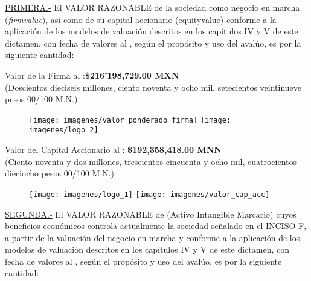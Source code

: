 \textcolor{principal}{\underline{PRIMERA.-}} El \textcolor{principal}{VALOR RAZONABLE} de la sociedad \textcolor{principal}{\empresaSolicitante} como negocio en marcha (\textit{\gls{firmvalue}}), as\'i como de su capital accionario (\gls{equityvalue}) conforme a la aplicaci\'on de los modelos de valuaci\'on descritos en los cap\'itulos IV y V de este dictamen, con fecha de valores al \fechaValores, seg\'un el prop\'osito y uso del aval\'uo, es por la siguiente cantidad:\\
\begin{center}
\textcolor{principal}{Valor de la Firma al \fechaValoresCorto:}\textbf{\$216'198,729.00 MXN}\\

(\textcolor{secundario}{Doscientos dieciseis millones, ciento noventa y ocho mil, setecientos veintinueve pesos 00/100 M.N.})

\begin{figure}[H]
\centering
\texttt{[image: imagenes/valor\_ponderado\_firma]}\hspace{.5cm} \texttt{[image: imagenes/logo\_2]}\\
\end{figure}


\textcolor{principal}{Valor del Capital Accionario al \fechaValoresCorto:} \textbf{\$192,358,418.00 MNN}\\
(\textcolor{secundario}{Ciento noventa y dos millones, trescientos cincuenta y ocho mil, cuatrocientos dieciocho pesos 00/100 M.N.})\\
\end{center}

\begin{figure}[H]
\centering
\texttt{[image: imagenes/logo\_1]}\hspace{2.1cm} \texttt{[image: imagenes/valor\_cap\_acc]}

\end{figure}
\espacio{.5cm}



\textcolor{principal}{\underline{SEGUNDA.-}} El \textcolor{principal}{VALOR RAZONABLE} de \textcolor{principal}{\marca{}} (Activo Intangible Marcario) cuyos beneficios econ\'omicos controla actualmente la sociedad \textcolor{principal}{\empresaSolicitante} se\~nalado en el INCISO F,  a partir de la valuaci\'on del negocio en marcha y conforme a la aplicaci\'on de los modelos de valuaci\'on descritos en los cap\'itulos IV y V de este dictamen, con fecha de valores al \textcolor{principal}{\textbf{\fechaValores}}, seg\'un el prop\'osito y uso del aval\'uo, es por la siguiente cantidad:\\

